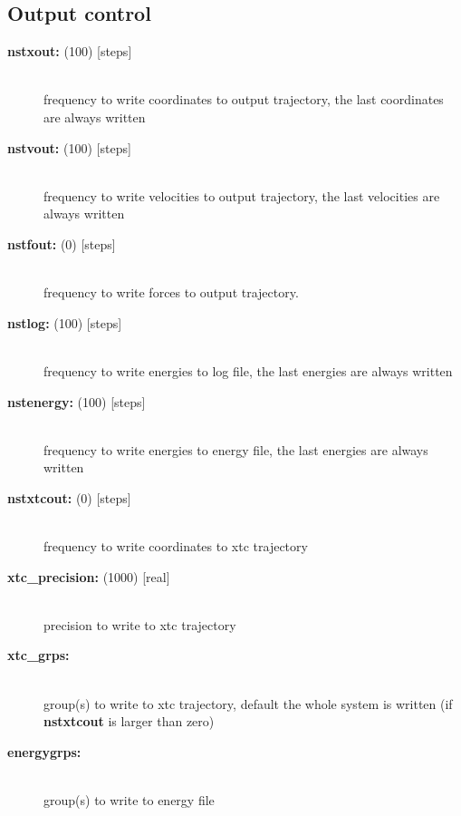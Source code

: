\subsection{Output control}
\begin{description}
\item[{\bf nstxout: }(100) {[steps]}]\mbox{}\\
frequency to write coordinates to output trajectory,
the last coordinates are always written
\item[{\bf nstvout: }(100) {[steps]}]\mbox{}\\
frequency  to write velocities to output trajectory,
the last velocities are always written
\item[{\bf nstfout: }(0) {[steps]}]\mbox{}\\
frequency to write forces to output trajectory.
\item[{\bf nstlog: }(100) {[steps]}]\mbox{}\\
frequency to write energies to log file,
the last energies are always written
\item[{\bf nstenergy: }(100) {[steps]}]\mbox{}\\
frequency to write energies to energy file,
the last energies are always written
\item[{\bf nstxtcout: }(0) {[steps]}]\mbox{}\\
frequency to write coordinates to xtc trajectory
\item[{\bf xtc\_precision: }(1000) {[real]}]\mbox{}\\
precision to write to xtc trajectory
\item[{\bf xtc\_grps:}]\mbox{}\\
group(s) to write to xtc trajectory, default the whole system is written
(if {\bf nstxtcout} is larger than zero)  
\item[{\bf energygrps:}]\mbox{}\\
group(s) to write to energy file
\end{description}

